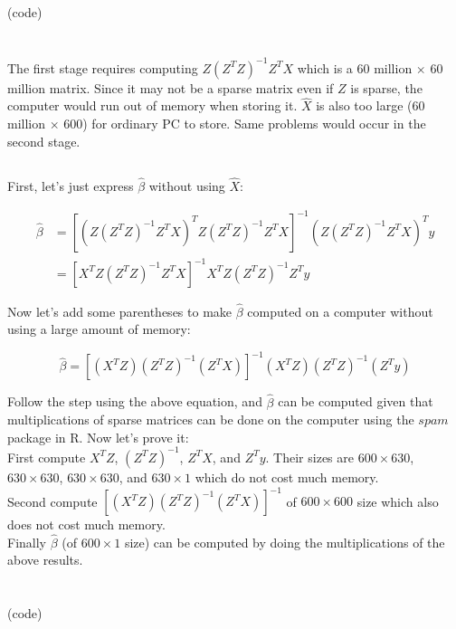 \documentclass[12pt]{article}
\begin{document}
\subsection{}
(code)

\section{}

\subsection{}

The first stage requires computing $Z(Z^TZ)^{-1}Z^TX$ which is a 60 million $\times$ 60 million matrix. Since it may not be a sparse matrix even if $Z$ is sparse, the computer would run out of memory when storing it. $\hat{X}$ is also too large (60 million $\times$ 600) for ordinary PC to store. Same problems would occur in the second stage.

\subsection{}

First, let's just express $\hat{\beta}$ without using $\hat{X}$:

\begin{equation*}
\begin{split}
\hat{\beta}&=[(Z(Z^TZ)^{-1}Z^TX)^TZ(Z^TZ)^{-1}Z^TX]^{-1}(Z(Z^TZ)^{-1}Z^TX)^Ty\\
&=[X^TZ(Z^TZ)^{-1}Z^TX]^{-1}X^TZ(Z^TZ)^{-1}Z^Ty
\end{split}
\end{equation*}

\noindent Now let's add some parentheses to make $\hat{\beta}$ computed on a computer without using a large amount of memory:

\begin{equation*}
\hat{\beta}=[(X^TZ)(Z^TZ)^{-1}(Z^TX)]^{-1}(X^TZ)(Z^TZ)^{-1}(Z^Ty)
\end{equation*}

\noindent Follow the step using the above equation, and $\hat{\beta}$ can be computed given that multiplications of sparse matrices can be done on the computer using the $spam$ package in R. Now let's prove it:\\

\noindent First compute $X^TZ$, $(Z^TZ)^{-1}$, $Z^TX$, and $Z^Ty$. Their sizes are $600\times 630$, $630\times 630$, $630\times 630$, and $630\times 1$ which do not cost much memory.\\

\noindent Second compute $[(X^TZ)(Z^TZ)^{-1}(Z^TX)]^{-1}$ of $600\times 600$ size which also does not cost much memory.\\

\noindent Finally $\hat{\beta}$ (of $600\times 1$ size) can be computed by doing the multiplications of the above results.

\section{}
(code)
\end{document}
